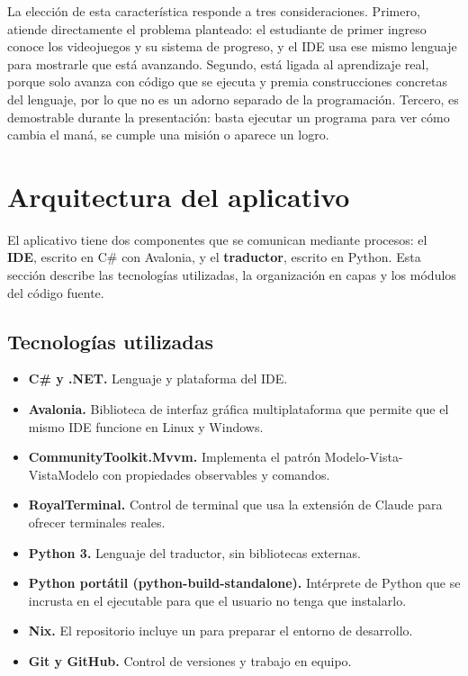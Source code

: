 La elección de esta característica responde a tres consideraciones. Primero, atiende directamente el problema planteado: el estudiante de primer ingreso conoce los videojuegos y su sistema de progreso, y el IDE usa ese mismo lenguaje para mostrarle que está avanzando. Segundo, está ligada al aprendizaje real, porque solo avanza con código que se ejecuta y premia construcciones concretas del lenguaje, por lo que no es un adorno separado de la programación. Tercero, es demostrable durante la presentación: basta ejecutar un programa para ver cómo cambia el maná, se cumple una misión o aparece un logro.

\newpage
\section{Arquitectura del aplicativo}

El aplicativo tiene dos componentes que se comunican mediante procesos: el \textbf{IDE}, escrito en C\# con Avalonia, y el \textbf{traductor}, escrito en Python. Esta sección describe las tecnologías utilizadas, la organización en capas y los módulos del código fuente.

\subsection{Tecnologías utilizadas}

\begin{itemize}
  \item \textbf{C\# y .NET.} Lenguaje y plataforma del IDE.
  \item \textbf{Avalonia.} Biblioteca de interfaz gráfica multiplataforma que permite que el mismo IDE funcione en Linux y Windows.
  \item \textbf{CommunityToolkit.Mvvm.} Implementa el patrón Modelo-Vista-VistaModelo con propiedades observables y comandos.
  \item \textbf{RoyalTerminal.} Control de terminal que usa la extensión de Claude para ofrecer terminales reales.
  \item \textbf{Python 3.} Lenguaje del traductor, sin bibliotecas externas.
  \item \textbf{Python portátil (python-build-standalone).} Intérprete de Python que se incrusta en el ejecutable para que el usuario no tenga que instalarlo.
  \item \textbf{Nix.} El repositorio incluye un  para preparar el entorno de desarrollo.
  \item \textbf{Git y GitHub.} Control de versiones y trabajo en equipo.
\end{itemize}

